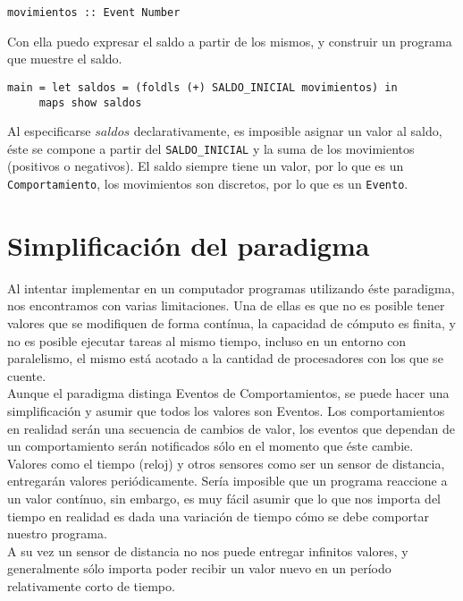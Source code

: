 \begin{verbatim}
movimientos :: Event Number
\end{verbatim}

  Con ella puedo expresar el saldo a partir de los mismos, y construir
un programa que muestre el saldo.

\begin{verbatim}
main = let saldos = (foldls (+) SALDO_INICIAL movimientos) in
     maps show saldos
\end{verbatim}

  Al especificarse $saldos$ declarativamente, es imposible asignar un valor al saldo,
éste se compone a partir del \texttt{SALDO\_INICIAL} y la suma de
los movimientos (positivos o negativos).
  El saldo siempre tiene un valor, por lo que es un \texttt{Comportamiento}, los movimientos
son discretos, por lo que es un \texttt{Evento}.

\section{Simplificación del paradigma}

  Al intentar implementar en un computador programas utilizando éste paradigma, nos encontramos
con varias limitaciones.
  Una de ellas es que no es posible tener valores que se modifiquen de forma contínua, la capacidad
de cómputo es finita, y no es posible ejecutar tareas al mismo tiempo, incluso en un entorno con
paralelismo, el mismo está acotado a la cantidad de procesadores con los que se cuente.\\

  Aunque el paradigma distinga Eventos de Comportamientos, se puede hacer una simplificación y
asumir que todos los valores son Eventos. Los comportamientos en realidad serán una secuencia de
cambios de valor, los eventos que dependan de un comportamiento serán notificados sólo en el momento
que éste cambie.\\
  Valores como el tiempo (reloj) y otros sensores como ser un sensor de distancia, entregarán valores
periódicamente. Sería imposible que un programa reaccione a un valor contínuo, sin embargo, es muy fácil
asumir que lo que nos importa del tiempo en realidad es dada una variación de tiempo cómo se debe
comportar nuestro programa.\\
  A su vez un sensor de distancia no nos puede entregar infinitos valores, y generalmente sólo importa
poder recibir un valor nuevo en un período relativamente corto de tiempo.

